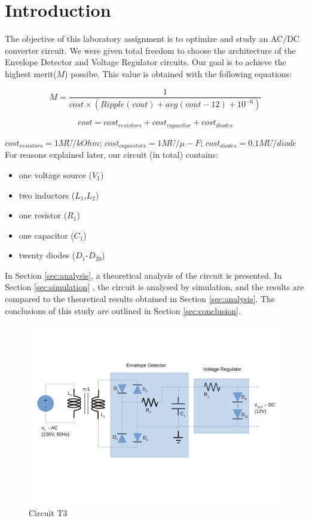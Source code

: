 
\section{Introduction}
\label{sec:introduction}



The objective of this laboratory assignment is to optimize and study an AC/DC converter
circuit. We were given total freedom to choose the architecture of the Envelope Detector
and Voltage Regulator circuits. Our goal is to achieve the highest merit($M$) possibe. This
value is obtained with the following equations:
	
\[
M = \frac{1}{cost\times (Ripple(vout) + avg(vout-12) + 10^{-6})}
\]

\[
 cost = cost_{resistors} + cost_{capacitor} + cost_{diodes} 
\]

$cost_{resistors} = 1MU/kOhm$; $cost_{capacitors} = 1MU/\mu- F$;
$cost_{diodes} = 0.1MU/diode$ \\

For reasons explained later, our circuit (in total) contains:

\begin{itemize}
	\item one voltage source ($V_1$)
	\item two inductors ($L_1$,$L_2$)
	\item one resistor ($R_1$)
	\item one capacitor ($C_1$)
	\item twenty diodes ($D_1$-$D_{20}$)
\end{itemize}

In Section \ref{sec:analysis}, a theoretical analysis of the circuit is presented. In
Section \ref{sec:simulation} , the circuit is analysed by simulation, and the results are
compared to the theoretical results obtained in Section \ref{sec:analysis}. The conclusions
of this study are outlined in Section \ref{sec:conclusion}.


\begin{figure}[h]
	\centering
	\includegraphics[width=0.85\linewidth]{dsnh_t3.pdf}
	\caption{Circuit T3}
\label{fig:Desenho_t3}
\end{figure}


